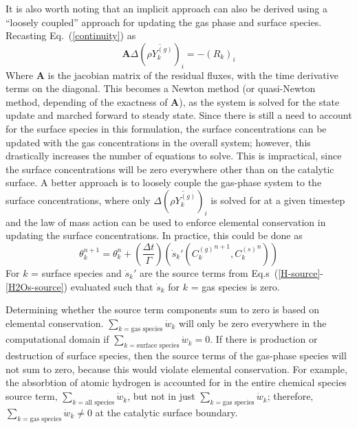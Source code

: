\documentclass{report}
\newcommand{\eref}[1]{Eq.~(\ref{#1})}
\newcommand{\erefs}[2]{Eq.s~(\ref{#1}-\ref{#2})}
\newcommand{\sk}{\dot{s}_k}
\newcommand{\cg}[1]{{C_{#1}^{(g)}}}
\newcommand{\cs}[1]{{C_{#1}^{(s)}}}
\newcommand{\ry}{{\rho Y_{k}^{(g)}}}
\newcommand{\ma}{\mathbf{A}}
\begin{document}
\begin{enumerate}[label=(\alph*)]
    It is also worth noting that an implicit approach can also be derived
    using a ``loosely coupled'' approach for updating the gas phase and surface
    species. Recasting \eref{continuity} as
    \begin{equation}
      \ma \Delta (\overline{\ry})_i = -(R_k)_i
      \label{implicit-continuity}
    \end{equation}
    Where $\ma$ is the jacobian matrix of the residual fluxes, with the time
    derivative terms on the diagonal.  This becomes a Newton method (or
    quasi-Newton method, depending of the exactness of $\ma$), as the system is
    solved for the state update and marched forward to steady state.  Since
    there is still a need to account for the surface species in this
    formulation, the surface concentrations can be updated with the gas
    concentrations in the overall system; however, this drastically increases
    the number of equations to solve.  This is impractical, since the surface
    concentrations will be zero everywhere other than on the catalytic surface.
    A better approach is to loosely couple the gas-phase system to the surface
    concentrations, where only $\Delta (\overline{\ry})_i$ is solved for at a
    given timestep and the law of mass action can be used to enforce elemental
    conservation in updating the surface concentrations.  In practice, this
    could be done as
    \begin{equation}
      \theta_{k}^{n+1} = \theta_{k}^{n} + \left(\frac{\Delta t}{\Gamma}
      \right)\left(\sk'(\cg{k}^{n+1},\cs{k}^{n})\right)
      \label{theta-update-decoupled}
    \end{equation}
    For $k$ = surface species and $\sk'$ are the source terms from
    \erefs{H-source}{H2Os-source} evaluated such that $\sk$ for $k$ = gas
    species is zero.

    Determining whether the source term components sum to zero is based on
    elemental conservation.  $\sum_{k=\text{gas species}}{\dot{w}_k}$ will only
    be zero everywhere in the computational domain if $\sum_{k=\text{surface
    species}}{\dot{w}_k} = 0$.  If there is production or destruction of surface
    species, then the source terms of the gas-phase species will not sum to
    zero, because this would violate elemental conservation. For example, the
    absorbtion of atomic hydrogen is accounted for in the entire chemical
    species source term, $\sum_{k=\text{all species}}{\dot{w}_k}$, but not in
    just $\sum_{k=\text{gas species}}{\dot{w}_k}$; therefore,
    $\sum_{k=\text{gas species}}{\dot{w}_k} \ne 0$ at the catalytic surface
    boundary. 

\end{enumerate}
\end{document}
